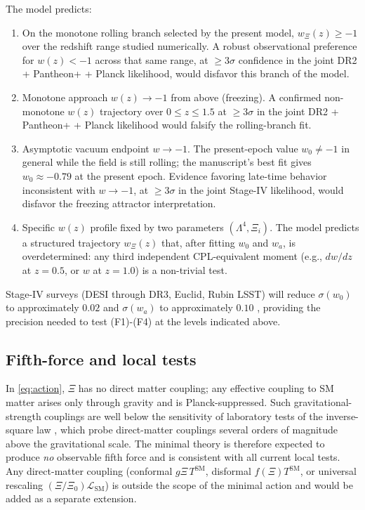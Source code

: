 \documentclass[11pt,reqno]{amsart}
\theoremstyle{plain}
\theoremstyle{definition}
\theoremstyle{remark}
\newcommand{\SM}{\mathrm{SM}}
\begin{document}
The model predicts:
\begin{enumerate}
  \item[(F1)] On the monotone rolling branch selected by the present
        model, $w_\Xi(z) \geq -1$ over the redshift range studied
        numerically. A robust observational preference for $w(z) < -1$
        across that same range, at $\geq 3\sigma$ confidence in the joint
        DR2 + Pantheon+ + Planck likelihood, would disfavor this branch
        of the model.
  \item[(F2)] Monotone approach $w(z) \to -1$ from above (freezing). A
        confirmed non-monotone $w(z)$ trajectory over $0 \leq z \leq 1.5$
        at $\geq 3\sigma$ in the joint DR2 + Pantheon+ + Planck likelihood
        would falsify the rolling-branch fit.
  \item[(F3)] Asymptotic vacuum endpoint $w \to -1$. The present-epoch
        value $w_0 \neq -1$ in general while the field is still rolling;
        the manuscript's best fit gives $w_0 \approx -0.79$ at the present
        epoch. Evidence favoring late-time behavior inconsistent with
        $w \to -1$, at $\geq 3\sigma$ in the joint Stage-IV likelihood,
        would disfavor the freezing attractor interpretation.
  \item[(F4)] Specific $w(z)$ profile fixed by two parameters
        $(\Lambda^{4}, \Xi_i)$. The model predicts a structured
        trajectory $w_\Xi(z)$ that, after fitting $w_0$ and $w_a$, is
        overdetermined: any third independent CPL-equivalent moment
        (e.g., $dw/dz$ at $z=0.5$, or $w$ at $z=1.0$) is a non-trivial
        test.
\end{enumerate}
Stage-IV surveys (DESI through DR3, Euclid, Rubin LSST) will reduce
$\sigma(w_0)$ to approximately $0.02$ and $\sigma(w_a)$ to approximately
$0.10$ \cite{ShajibFrieman2025,Turyshev2026Review}, providing the
precision needed to test (F1)-(F4) at the levels indicated above.

\subsection{Fifth-force and local tests}

In \eqref{eq:action}, $\Xi$ has no direct matter coupling; any effective
coupling to SM matter arises only through gravity and is Planck-suppressed.
Such gravitational-strength couplings are well below the sensitivity of
laboratory tests of the inverse-square law \cite{EotWash,MICROSCOPE},
which probe direct-matter couplings several orders of magnitude above
the gravitational scale. The minimal theory is therefore expected to
produce \emph{no} observable fifth force and is consistent with all
current local tests. Any direct-matter coupling (conformal
$g\Xi\, T^{\SM}$, disformal $f(\Xi) T^{\SM}$, or universal rescaling
$(\Xi/\Xi_0) \mathcal{L}_{\SM}$) is outside the scope of the minimal
action and would be added as a separate extension.
\end{document}
